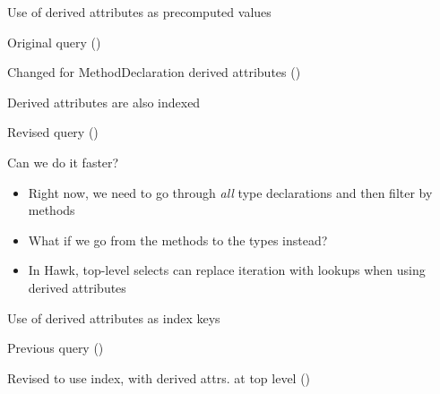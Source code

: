 \begin{frame}[fragile]{Use of derived attributes as precomputed values}

  \begin{block}{Original query ()}
    
  \end{block}

  \begin{block}{Changed for MethodDeclaration derived attributes ()}
    
  \end{block}
\end{frame}



\begin{frame}{Derived attributes are also indexed}
  \begin{block}{Revised query ()}
    
  \end{block}

  \begin{block}{Can we do it faster?}
    \begin{itemize}
    \item Right now, we need to go through \emph{all} type declarations and then
      filter by methods
    \item What if we go from the methods to the types instead?
    \item In Hawk, \alert{top-level selects can replace iteration with lookups
      when using derived attributes}
    \end{itemize}
  \end{block}
\end{frame}

\begin{frame}{Use of derived attributes as index keys}

  \begin{block}{Previous query ()}
    
  \end{block}

  \begin{block}{Revised to use index, with derived attrs. at top level ()}
    
  \end{block}

\end{frame}

